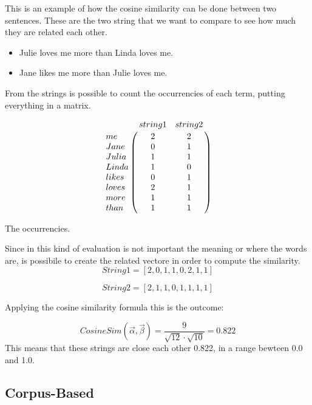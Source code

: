 This is an example of how the cosine similarity can be done  between two sentences.
These are the two string that we want to compare to see how much they are related each other.

\begin{itemize}
\item Julie loves me more than Linda loves me.
\item Jane likes me more than Julie loves me.
\end{itemize}
\newpage
From the strings is possible to count the occurrencies of each term, putting everything in a matrix.
\begin{table}
	\begin{equation} \nonumber
	\bordermatrix{~ & string 1 & string 2 \cr	
		me 		& 2 & 2  \cr 
		Jane		& 0 & 1  \cr  
		Julia		& 1 & 1  \cr
		Linda 		& 1 & 0  \cr 
		likes		& 0 & 1  \cr
		loves		& 2 & 1  \cr
		more		& 1 & 1  \cr
		than		& 1 & 1  \cr	}
	\end{equation}
	\caption{The occurrencies.}
	\label{fig:TDM}
\end{table}

Since in this kind of evaluation is not important the meaning or where the words are, is possibile to create the related vectore in order to compute the similarity.\\

	\begin{equation} \nonumber
	String1 = [2, 0, 1, 1, 0, 2, 1, 1]
	\end{equation}

	\begin{equation} \nonumber
	String2 = [2, 1, 1, 0, 1, 1, 1, 1]
	\end{equation}

Applying the cosine similarity formula this is the outcome:

\begin{equation} \label{eqn:Cosine}
CosineSim(\vec{\alpha},\vec{\beta}) = \frac{9}{\sqrt{12}\cdot \sqrt{10}} = 0.822
\end{equation}
This means that these strings are close each other 0.822, in a range bewteen 0.0 and 1.0.

\subsection{Corpus-Based}
